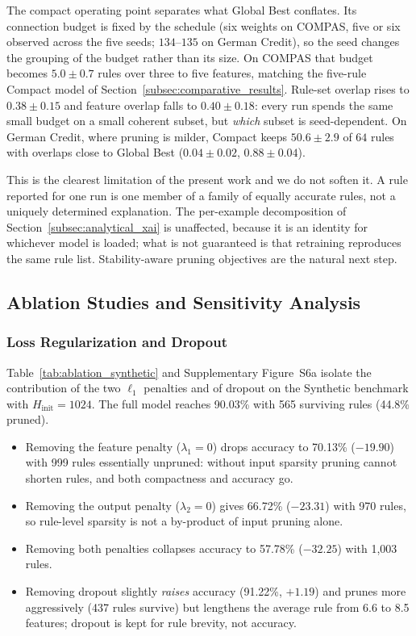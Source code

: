 The compact operating point separates what Global Best conflates. Its connection
budget is fixed by the schedule (six weights on COMPAS, five or six observed
across the five seeds; $134$--$135$ on German Credit), so the seed changes the
grouping of the budget rather than its size. On COMPAS that budget becomes
$5.0 \pm 0.7$ rules over three to five features, matching the five-rule Compact
model of Section~\ref{subsec:comparative_results}. Rule-set overlap rises to
$0.38 \pm 0.15$ and feature overlap falls to $0.40 \pm 0.18$: every run spends
the same small budget on a small coherent subset, but \emph{which} subset is
seed-dependent. On German Credit, where pruning is milder, Compact keeps
$50.6 \pm 2.9$ of $64$ rules with overlaps close to Global Best
($0.04 \pm 0.02$, $0.88 \pm 0.04$).

This is the clearest limitation of the present work and we do not soften it. A
rule reported for one run is one member of a family of equally accurate rules,
not a uniquely determined explanation. The per-example decomposition of
Section~\ref{subsec:analytical_xai} is unaffected, because it is an identity for
whichever model is loaded; what is not guaranteed is that retraining reproduces
the same rule list. Stability-aware pruning objectives are the natural next step.




\subsection{Ablation Studies and Sensitivity Analysis}
\label{subsec:ablations}

\subsubsection{Loss Regularization and Dropout}
Table~\ref{tab:ablation_synthetic} and Supplementary Figure~S6a
isolate the contribution of the two $\ell_1$ penalties and of dropout on the
Synthetic benchmark with $H_{\text{init}} = 1024$. The full model reaches 90.03\%
with 565 surviving rules (44.8\% pruned).
\begin{itemize}
    \item Removing the feature penalty ($\lambda_1 = 0$) drops accuracy to
    70.13\% ($-19.90$) with 999 rules essentially unpruned: without input
    sparsity pruning cannot shorten rules, and both compactness and accuracy go.
    \item Removing the output penalty ($\lambda_2 = 0$) gives 66.72\%
    ($-23.31$) with 970 rules, so rule-level sparsity is not a by-product of
    input pruning alone.
    \item Removing both penalties collapses accuracy to 57.78\% ($-32.25$) with
    1{,}003 rules.
    \item Removing dropout slightly \emph{raises} accuracy (91.22\%, $+1.19$) and
    prunes more aggressively (437 rules survive) but lengthens the average rule from 6.6 to 8.5
    features; dropout is kept for rule brevity, not accuracy.
\end{itemize}

